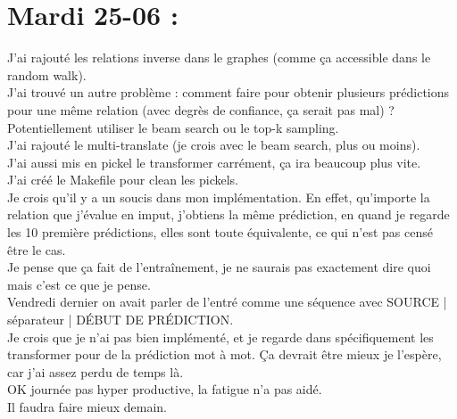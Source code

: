 \documentclass{article}
\begin{document}
\section*{Mardi 25-06 :}
J'ai rajouté les relations inverse dans le graphes (comme ça accessible dans le random walk).\\
J'ai trouvé un autre problème : comment faire pour obtenir plusieurs prédictions pour une même relation (avec degrès de confiance, ça serait pas mal) ?\\
Potentiellement utiliser le beam search ou le top-k sampling.\\
J'ai rajouté le multi-translate (je crois avec le beam search, plus ou moins).\\
J'ai aussi mis en pickel le transformer carrément, ça ira beaucoup plus vite.\\
J'ai créé le Makefile pour clean les pickels.\\
Je crois qu'il y a un soucis dans mon implémentation. En effet, qu'importe la relation que j'évalue en imput, j'obtiens la même prédiction, en quand je regarde les 10 première prédictions, elles sont toute équivalente, ce qui n'est pas censé être le cas.\\
Je pense que ça fait de l'entraînement, je ne saurais pas exactement dire quoi mais c'est ce que je pense.\\
Vendredi dernier on avait parler de l'entré comme une séquence avec SOURCE | séparateur | DÉBUT DE PRÉDICTION.\\
Je crois que je n'ai pas bien implémenté, et je regarde dans spécifiquement les transformer pour de la prédiction mot à mot. Ça devrait être mieux je l'espère, car j'ai assez perdu de temps là.\\
OK journée pas hyper productive, la fatigue n'a pas aidé.\\
Il faudra faire mieux demain.\\
\end{document}
